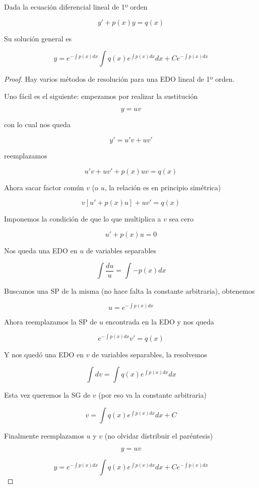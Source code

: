 \begin{proposition} \label{resolucion_lineal_1er_orden}

Dada la ecuación diferencial lineal de 1º orden

$$ y' + p(x) y = q(x) $$

Su solución general es 

$$ y = e^{-\int p(x) dx} \int q(x) e^{\int p(x) dx} dx + C e^{-\int p(x) dx} $$

\end{proposition}

\begin{proof}

Hay varios métodos de resolución para una EDO lineal de 1º orden.  

Uno fácil es el siguiente: empezamos por realizar la sustitución 

$$ y = uv $$

con lo cual nos queda 

$$ y' = u'v + uv' $$

reemplazamos

$$ u'v + uv' + p(x) uv = q(x) $$

Ahora sacar factor común $v$ (o $u$, la relación es en principio simétrica)

$$ v[u' + p(x) u] + uv' = q(x) $$

Imponemos la condición de que lo que multiplica a $v$ sea cero

$$ u' + p(x) u = 0 $$

Nos queda una EDO en $u$ de variables separables

$$ \int \frac{du}{u} = \int -p(x) dx$$

Buscamos una SP de la misma (no hace falta la constante arbitraria), obtenemos

$$ u = e^{-\int p(x) dx} $$

Ahora reemplazamos la SP de $u$ encontrada en la EDO y nos queda

$$ e^{- \int p(x) dx} v' = q(x) $$

Y nos quedó una EDO en $v$ de variables separables, la resolvemos

$$ \int dv = \int q(x) e^{\int p(x) dx} dx $$

Esta vez queremos la SG de $v$ (por eso va la constante arbitraria)

$$ v = \int q(x) e^{\int p(x) dx} dx + C $$

Finalmente reemplazamos $u$ y $v$ (no olvidar distribuir el paréntesis)

$$ y = uv $$

$$ y = e^{-\int p(x) dx} \int q(x) e^{\int p(x) dx} dx + C e^{-\int p(x) dx} $$

\end{proof}

